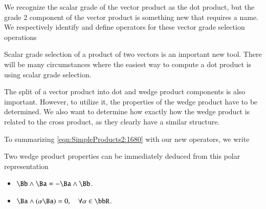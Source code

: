 We recognize the scalar grade of the vector product as the  dot product, but the grade 2 component of the vector product is something new that requires a name.  We respectively identify and define operators for these vector grade selection operations


Scalar grade selection of a product of two vectors is an important new tool.
There will be many circumstances where the easiest way to compute a dot product is using scalar grade selection.

The split of a vector product into dot and wedge product components is also important.  However, to utilize it, the properties of the wedge product have to be determined.  We also want to determine how exactly how the wedge product is related to the cross product, as they clearly have a similar structure.

To summarizing \cref{eqn:SimpleProducts2:1680} with our new operators, we write


Two wedge product properties can be immediately deduced from this polar representation

\begin{itemize}
\item \( \Bb \wedge \Ba = - \Ba \wedge \Bb \).
\item \( \Ba \wedge (\alpha \Ba) = 0, \quad \forall \alpha \in \bbR \).
\end{itemize}

